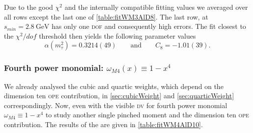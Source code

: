 \documentclass[../../index.tex]{subfiles}
\begin{document}
Due to the good \(\chi^2\) and the internally compatible fitting values we
averaged over all rows except the last one of \cref{table:fitWM3AlD8}. The last
row, at \(s_{min}=\SI{2.8}{\giga\eV}\) has only one \textsc{dof} and consequently high
errors. The fit closest to the \(\chi^2/dof\) threshold then yields the
following parameter values
\begin{equation}
  \alpha(m_\tau^2) = 0.3214(49) \qquad \text{and} \qquad C_8=-1.01(39).
\end{equation}


\subsubsection{Fourth power monomial: \(\omega_{M4}(x) \equiv 1-x^4\)}
We already analysed the cubic and quartic weights, which depend on the dimension
ten \textsc{ope} contribution, in \cref{sec:cubicWeight} and
\cref{sec:quarticWeight} correspondingly. Now, even with the visible \textsc{dv}
for fourth power monomial \(\omega_{M4}\equiv 1-x^4\) to study another single
pinched moment and the dimension ten \textsc{ope} contribution. The results of
the are given in \cref{table:fitWM4AlD10}.
\end{document}
